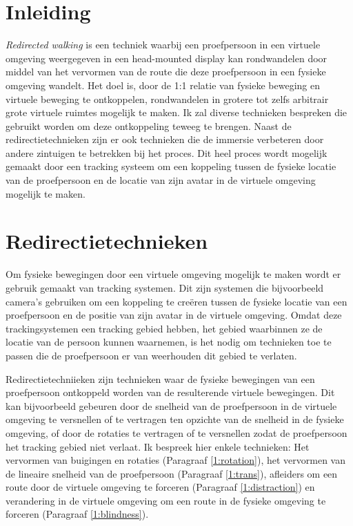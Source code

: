 \section{Inleiding}
\emph{Redirected walking} is een techniek waarbij een proefpersoon in een 
virtuele omgeving weergegeven in een head-mounted display kan rondwandelen door 
middel van het vervormen van de route die deze proefpersoon in een fysieke 
omgeving wandelt. Het doel is, door de 1:1 relatie van fysieke beweging en 
virtuele beweging te ontkoppelen, rondwandelen in grotere tot zelfs arbitrair 
grote virtuele ruimtes mogelijk te maken. Ik zal diverse technieken bespreken die
gebruikt worden om deze ontkoppeling teweeg te brengen. Naast de
redirectietechnieken zijn er ook technieken die de immersie verbeteren door
andere zintuigen te betrekken bij het proces. Dit heel proces wordt mogelijk 
gemaakt door een tracking systeem om een koppeling tussen de fysieke locatie van 
de proefpersoon en de locatie van zijn avatar in de virtuele omgeving mogelijk te
maken.


\section{Redirectietechnieken}
Om fysieke bewegingen door een virtuele omgeving mogelijk te maken wordt er
gebruik gemaakt van tracking systemen. Dit zijn systemen die bijvoorbeeld
camera's gebruiken om een koppeling te cre\"eren tussen de fysieke locatie van
een proefpersoon en de positie van zijn avatar in de virtuele omgeving. Omdat
deze trackingsystemen een tracking gebied hebben, het gebied waarbinnen ze de
locatie van de persoon kunnen waarnemen, is het nodig om technieken toe te passen
die de proefpersoon er van weerhouden dit gebied te verlaten.

Redirectietechniieken zijn technieken waar de fysieke bewegingen van een 
proefpersoon ontkoppeld worden van de resulterende virtuele bewegingen. Dit kan 
bijvoorbeeld gebeuren door de snelheid van de proefpersoon in de virtuele 
omgeving te versnellen of te vertragen ten opzichte van de snelheid in de fysieke
omgeving, of door de rotaties te vertragen of te versnellen zodat de proefpersoon
het tracking gebied niet verlaat. Ik bespreek hier enkele technieken: Het 
vervormen van buigingen en rotaties (Paragraaf \ref{1:rotation}), het vervormen van 
de lineaire snelheid van de proefpersoon (Paragraaf \ref{1:trans}), afleiders om
een route door de virtuele omgeving te forceren (Paragraaf \ref{1:distraction}) 
en verandering in de virtuele omgeving om een route in de fysieke omgeving te
forceren (Paragraaf \ref{1:blindness}).


